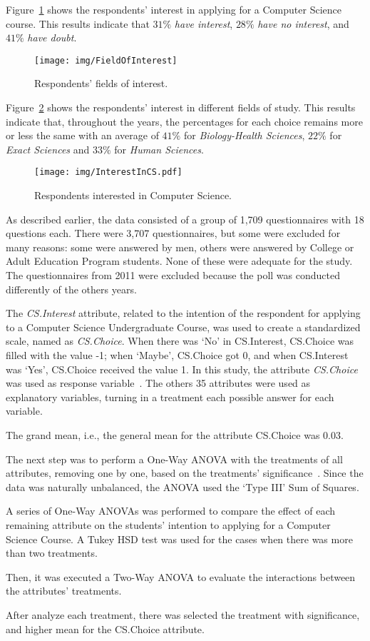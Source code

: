 Figure~\ref{fig:FieldOfInterest} shows the respondents' interest in applying for a Computer Science course. This results indicate that $31\%$  \emph{have interest}, $28\%$  \emph{have no interest}, and $41\%$  \emph{have doubt}.

\begin{figure}%
\texttt{[image: img/FieldOfInterest]}%
\caption{Respondents' fields of interest.}%
\label{fig:FieldOfInterest}%
\end{figure}%

Figure~\ref{fig:InterestInCS.pdf} shows the respondents' interest in different fields of study. This results indicate that, throughout the years, the percentages for each choice remains more or less the same with an average of $41\%$ for \emph{Biology-Health Sciences}, $22\%$ for \emph{Exact Sciences} and $33\%$ for \emph{Human Sciences}.

\begin{figure}%
\texttt{[image: img/InterestInCS.pdf]}%
\caption{Respondents interested in Computer Science.}%
\label{fig:InterestInCS.pdf}%
\end{figure}%

As described earlier, the data consisted of a group of 1,709 questionnaires with 18 questions each. There were 3,707 questionnaires, but some were excluded for many reasons: some were answered by men, others were answered by College or Adult Education Program students. None of these were adequate for the study. The questionnaires from 2011 were excluded because the poll was conducted differently of the others years.

The \emph{CS.Interest} attribute, related to the intention of the respondent for applying to a Computer Science Undergraduate Course, was used to create a standardized scale, named as \emph{CS.Choice}. When there was `No' in CS.Interest, CS.Choice was filled with the value -1; when `Maybe', CS.Choice got 0, and when CS.Interest was `Yes', CS.Choice received the value 1. In this study, the attribute \emph{CS.Choice} was used as response variable~\cite{moore2009practice}. The others 35 attributes were used as explanatory variables, turning in a treatment each possible answer for each variable.

The grand mean, i.e., the general mean for the attribute CS.Choice was 0.03.

The next step was to perform a One-Way ANOVA with the treatments of all attributes, removing one by one, based on the treatments' significance~\cite{Chambers1990}. Since the data was naturally unbalanced, the ANOVA used the `Type III' Sum of Squares. 

A series of One-Way ANOVAs was performed to compare the effect of each remaining attribute on the students' intention to applying for a Computer Science Course. A Tukey HSD test was used for the cases when there was more than two treatments.
 
Then, it was executed a Two-Way ANOVA to evaluate the interactions between the attributes' treatments.

After analyze each treatment, there was selected the treatment with significance, and higher mean for the CS.Choice attribute.



